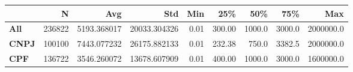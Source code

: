 \begin{tabular}{lrrrrrrrr}
\toprule
{} &      N &          Avg &           Std &   Min &     25\% &     50\% &     75\% &        Max \\
\midrule
\textbf{All } & 236822 &  5193.368017 &  20033.304326 &  0.01 &  300.00 &  1000.0 &  3000.0 &  2000000.0 \\
\textbf{CNPJ} & 100100 &  7443.077232 &  26175.882133 &  0.01 &  232.38 &   750.0 &  3382.5 &  2000000.0 \\
\textbf{CPF } & 136722 &  3546.260072 &  13678.607909 &  0.01 &  400.00 &  1000.0 &  3000.0 &  1600000.0 \\
\bottomrule
\end{tabular}
